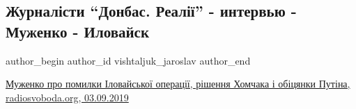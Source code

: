  
 
 
 
 
 
\subsection{Журналісти \enquote{Донбас. Реалії} - интервью - Муженко - Иловайск}
\label{sec:04_09_2019.fb.vishtaljuk_jaroslav.1.ilovajsk_muzhenko_interview}
 
\ifcmt
 author_begin
   author_id vishtaljuk_jaroslav
 author_end
\fi

\href{https://www.radiosvoboda.org/a/30142355.html}{%
Муженко про помилки Іловайської операції, рішення Хомчака і обіцянки Путіна, radiosvoboda.org, 03.09.2019%
}

